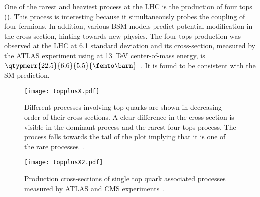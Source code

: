One of the rarest and heaviest process at the LHC is the production of four tops (\tttt).
This process is interesting because it simultaneously probes the coupling of four 
fermions. In addition, various BSM models predict potential modification in the 
cross-section, hinting towards new physics. The four tops production was observed 
at the LHC at 6.1 standard deviation and its
cross-section, measured by the ATLAS experiment using \lumi at \SI{13}{\TeV} center-of-mass energy,
is $\qtypmerr{22.5}{6.6}{5.5}{\femto\barn}$~\cite{ATLAS:2023ajo}. It is found to be consistent with the SM prediction.

\begin{figure}[htbp]
    \centering
    \texttt{[image: topplusX.pdf]}
    \caption[Production 
    cross-sections of various top quark associated processes]{Different processes involving
    top quarks are shown in decreasing order of their cross-sections. 
    A clear difference in the cross-section is visible in the dominant \ttbar process and 
    the rarest four tops process. The \tZq process falls towards the tail of the plot implying
    that it is one of the rare processes~\cite{ATL-PHYS-PUB-2024-006}.}%
    \label{fig:topX_cs}
\end{figure}

\begin{figure}[htbp]
    \centering
    \texttt{[image: topplusX2.pdf]}
    \caption[Production 
    cross-sections of single top quark associated processes]{Production 
    cross-sections of single top quark associated processes measured by ATLAS and CMS experiments~\cite{ATL-PHYS-PUB-2024-005}.}%
    \label{fig:topX2_cs}
\end{figure}







